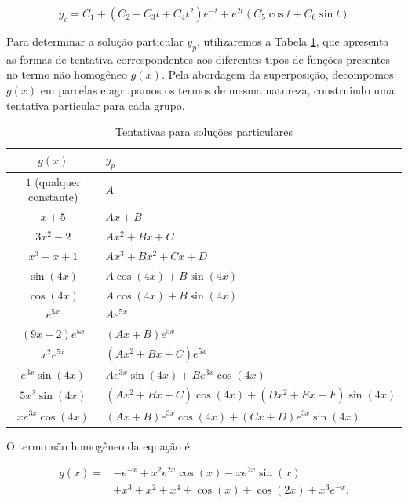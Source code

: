 {  \begin{equation}
    \boxed{
      y_c=C_1+(C_2+C_3t+C_4t^2)e^{-t}
      +e^{2t}\left(C_5\cos t+C_6\sin t\right)
    }
  \end{equation}

  \newpage

  Para determinar a solução particular $y_p$, utilizaremos a Tabela
  \ref{tab:solucoes_particulares}, que apresenta as formas de tentativa
  correspondentes aos diferentes tipos de funções presentes no termo não
  homogêneo $g(x)$. Pela abordagem da superposição, decompomos $g(x)$ em
  parcelas e agrupamos os termos de mesma natureza, construindo uma tentativa
  particular para cada grupo.

  \begin{table}[htbp]
    \centering
    \caption{Tentativas para soluções particulares}
    \label{tab:tentativas-solucoes-particulares}
    \renewcommand{\arraystretch}{1.2}
    \begin{tabular}{|c|l|}
      \hline
      $g(x)$ & $y_p$ \\ \hline
      $1$ (qualquer constante) & $A$ \\ \hline
      $x+5$ & $Ax+B$ \\ \hline
      $3x^2-2$ & $Ax^2+Bx+C$ \\ \hline
      $x^3-x+1$ & $Ax^3+Bx^2+Cx+D$ \\ \hline
      $\sin(4x)$ & $A\cos(4x)+B\sin(4x)$ \\ \hline
      $\cos(4x)$ & $A\cos(4x)+B\sin(4x)$ \\ \hline
      $e^{5x}$ & $Ae^{5x}$ \\ \hline
      $(9x-2)e^{5x}$ & $(Ax+B)e^{5x}$ \\ \hline
      $x^2e^{5x}$ & $(Ax^2+Bx+C)e^{5x}$ \\ \hline
      $e^{3x}\sin(4x)$ & $Ae^{3x}\sin(4x)+Be^{3x}\cos(4x)$ \\ \hline
      $5x^2\sin(4x)$ & $(Ax^2+Bx+C)\cos(4x)+(Dx^2+Ex+F)\sin(4x)$ \\ \hline
      $xe^{3x}\cos(4x)$ & $(Ax+B)e^{3x}\cos(4x)+(Cx+D)e^{3x}\sin(4x)$ \\ \hline
    \end{tabular}
    \label{tab:solucoes_particulares}
  \end{table}
  
  O termo não homogêneo da equação é
  
  \begin{equation}
    \begin{aligned}
      g(x) ={}&
      -e^{-x}
      + x^2 e^{2x}\cos(x)
      - x e^{2x}\sin(x) \\
      &+ x^3 + x^2 + x^4
      + \cos(x) + \cos(2x)
      + x^3e^{-x}.
    \end{aligned}
  \end{equation}
  
}
